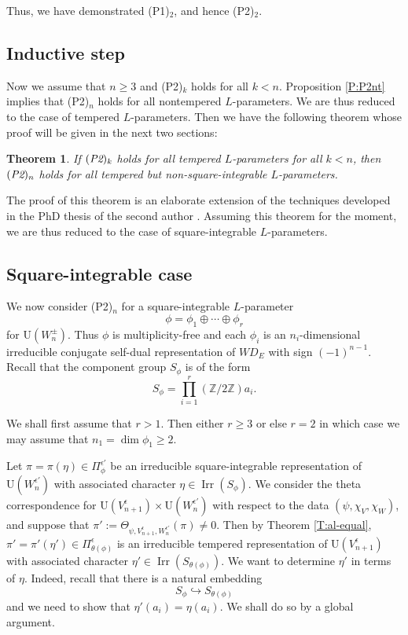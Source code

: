 \documentclass[11pt]{amsart}
\numberwithin{equation}{section}
\theoremstyle{plain}
\newtheorem{thm}{Theorem}[section]
\theoremstyle{definition}
\theoremstyle{remark}
\def\Irr{\operatorname{Irr}}
\def\U{\mathrm{U}}
\def\WD{\mathit{WD}}
\def\ZZ{\mathbb{Z}}
\begin{document}
Thus, we have demonstrated (P1)$_2$, and hence (P2)$_2$. 

\subsection{Inductive step}

Now we assume that $n \ge 3$ and (P2)$_k$ holds for all $k < n$. Proposition \ref{P:P2nt} implies that (P2)$_n$ holds for all nontempered $L$-parameters. We are thus reduced to the case of tempered $L$-parameters. Then we have the following theorem whose proof will be given in the next two sections:

\begin{thm}
\label{T:ind}
If $(\emph{P2})_k$ holds for all tempered $L$-parameters for all $k < n$, then $(\emph{P2})_n$ holds for all tempered but non-square-integrable $L$-parameters.
\end{thm}

The proof of this theorem is an elaborate extension of the techniques developed in the PhD thesis of the second author \cite{i}. Assuming this theorem for the moment, we are thus reduced to the case of square-integrable $L$-parameters. 

\subsection{Square-integrable case}

We now consider (P2)$_n$ for a square-integrable $L$-parameter  
\[  \phi  = \phi_1 \oplus  \cdots \oplus \phi_r \]
for $\U(W_n^\pm)$.
Thus $\phi$ is multiplicity-free and each $\phi_i$ is an $n_i$-dimensional irreducible conjugate self-dual representation of $\WD_E$ with sign $(-1)^{n-1}$.
Recall that the component group $S_{\phi}$ is of the form
\[   S_{\phi}  = \prod_{i=1}^r  (\ZZ / 2\ZZ) a_i. \]

We shall first assume that $r > 1$. Then either $r \ge 3$ or else $r =2$ in which case we may assume that $n_1 = \dim \phi_1 \ge 2$. 

Let $\pi = \pi(\eta) \in \Pi_{\phi}^{\epsilon'}$ be an irreducible square-integrable representation of $\U(W_n^{\epsilon'})$ with associated character $\eta \in \Irr(S_{\phi})$. We consider the theta correspondence for $\U(V_{n+1}^\epsilon) \times \U(W_n^{\epsilon'})$ with respect to the data $(\psi, \chi_V, \chi_W)$, and suppose that $\pi' := \Theta_{\psi, V_{n+1}^{\epsilon}, W_n^{\epsilon'}}(\pi) \ne 0$. Then by Theorem \ref{T:al-equal}, $\pi'  = \pi'(\eta')  \in \Pi_{\theta(\phi)}^\epsilon$ is an irreducible tempered representation of $\U(V_{n+1}^\epsilon)$ with associated character $\eta' \in \Irr(S_{\theta(\phi)})$. We want to determine $\eta'$ in terms of $\eta$. Indeed, recall that there is a natural embedding
\[  S_{\phi}  \hookrightarrow S_{\theta(\phi)}  \]
and we need to show that $\eta'(a_i)  = \eta(a_i)$. We shall do so by a global argument.
\end{document}
